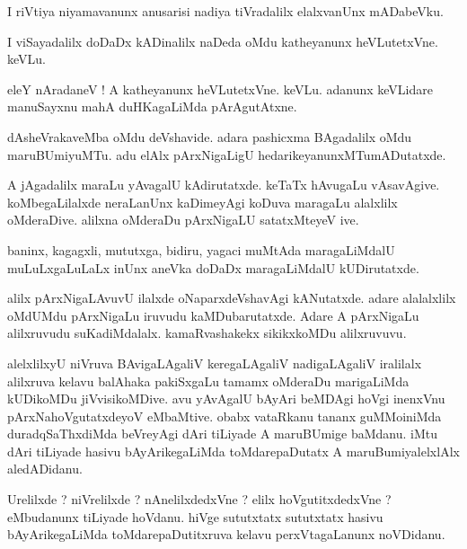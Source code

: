 \documentclass{article}
\begin{document}
\begin{mn}%
I riVtiya niyamavanunx anusarisi nadiya tiVradalilx elalxvanUnx mADabeVku.
\end{mn}

\begin{mn}%
I viSayadalilx doDaDx kADinalilx naDeda oMdu katheyanunx heVLutetxVne. keVLu.
\end{mn}

\begin{mn}%
eleY nAradaneV ! A katheyanunx heVLutetxVne. keVLu. adanunx keVLidare manuSayxnu mahA duHKagaLiMda 
pArAgutAtxne.
\end{mn}

\begin{mn}%
dAsheVrakaveMba oMdu deVshavide. adara pashicxma BAgadalilx oMdu maruBUmiyuMTu. adu elAlx 
pArxNigaLigU hedarikeyanunxMTumADutatxde.
\end{mn}

\begin{mn}%
A jAgadalilx maraLu yAvagalU kAdirutatxde. keTaTx hAvugaLu vAsavAgive. koMbegaLilalxde neraLanUnx 
kaDimeyAgi koDuva maragaLu alalxlilx oMderaDive. alilxna oMderaDu pArxNigaLU satatxMteyeV ive.
\end{mn}

\begin{mn}%
baninx, kagagxli, mututxga, bidiru, yagaci muMtAda maragaLiMdalU muLuLxgaLuLaLx inUnx aneVka doDaDx 
maragaLiMdalU kUDirutatxde.
\end{mn}

\begin{mn}%
alilx pArxNigaLAvuvU ilalxde oNaparxdeVshavAgi kANutatxde. adare alalalxlilx oMdUMdu pArxNigaLu 
iruvudu kaMDubarutatxde. Adare A pArxNigaLu alilxruvudu suKadiMdalalx. kamaRvashakekx sikikxkoMDu 
alilxruvuvu.
\end{mn}

\begin{mn}%
alelxlilxyU niVruva BAvigaLAgaliV keregaLAgaliV nadigaLAgaliV iralilalx alilxruva kelavu balAhaka 
pakiSxgaLu tamamx oMderaDu marigaLiMda kUDikoMDu jiVvisikoMDive. avu yAvAgalU bAyAri beMDAgi hoVgi 
inenxVnu pArxNahoVgutatxdeyoV eMbaMtive. obabx vataRkanu tananx guMMoiniMda duradqSaThxdiMda 
beVreyAgi dAri tiLiyade A maruBUmige baMdanu. iMtu dAri tiLiyade hasivu bAyArikegaLiMda 
toMdarepaDutatx A maruBumiyalelxlAlx aledADidanu.
\end{mn}

\begin{mn}%
Urelilxde ? niVrelilxde ? nAnelilxdedxVne ? elilx hoVgutitxdedxVne ? eMbudanunx tiLiyade hoVdanu. 
hiVge sututxtatx sututxtatx hasivu bAyArikegaLiMda toMdarepaDutitxruva kelavu perxVtagaLanunx 
noVDidanu.
\end{mn}
\end{document}
